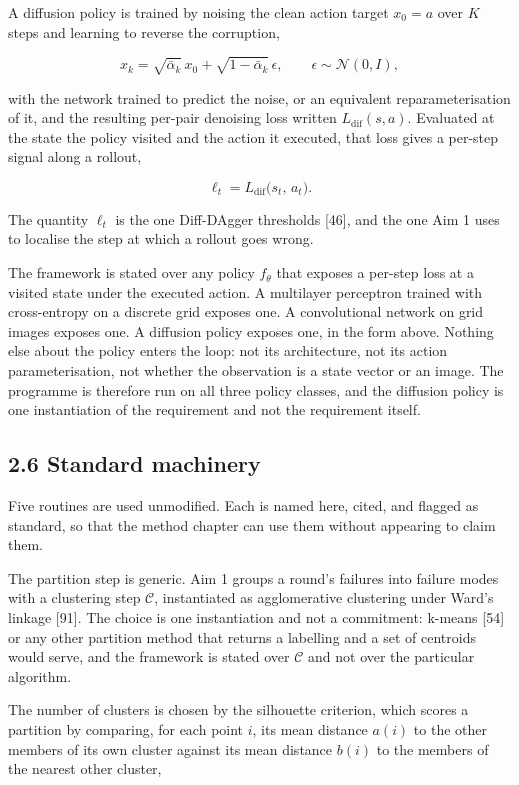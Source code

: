 \documentclass[
  11pt,
]{article}
\begin{document}
A diffusion policy is trained by noising the clean action target
\(x_0 = a\) over \(K\) steps and learning to reverse the corruption,

\[x_k = \sqrt{\bar\alpha_k}\, x_0 + \sqrt{1 - \bar\alpha_k}\, \epsilon,
\qquad \epsilon \sim \mathcal{N}(0, I),\]

with the network trained to predict the noise, or an equivalent
reparameterisation of it, and the resulting per-pair denoising loss
written \(L_{\mathrm{dif}}(s, a)\). Evaluated at the state the policy
visited and the action it executed, that loss gives a per-step signal
along a rollout,

\[\ell_t = L_{\mathrm{dif}}\big(s_t,\, a_t\big).\]

The quantity \(\ell_t\) is the one Diff-DAgger thresholds {[}46{]}, and
the one Aim 1 uses to localise the step at which a rollout goes wrong.

The framework is stated over any policy \(f_\theta\) that exposes a
per-step loss at a visited state under the executed action. A multilayer
perceptron trained with cross-entropy on a discrete grid exposes one. A
convolutional network on grid images exposes one. A diffusion policy
exposes one, in the form above. Nothing else about the policy enters the
loop: not its architecture, not its action parameterisation, not whether
the observation is a state vector or an image. The programme is
therefore run on all three policy classes, and the diffusion policy is
one instantiation of the requirement and not the requirement itself.

\hypertarget{standard-machinery}{%
\subsection{2.6 Standard machinery}\label{standard-machinery}}

Five routines are used unmodified. Each is named here, cited, and
flagged as standard, so that the method chapter can use them without
appearing to claim them.

The partition step is generic. Aim 1 groups a round's failures into
failure modes with a clustering step \(\mathcal{C}\), instantiated as
agglomerative clustering under Ward's linkage {[}91{]}. The choice is
one instantiation and not a commitment: k-means {[}54{]} or any other
partition method that returns a labelling and a set of centroids would
serve, and the framework is stated over \(\mathcal{C}\) and not over the
particular algorithm.

The number of clusters is chosen by the silhouette criterion, which
scores a partition by comparing, for each point \(i\), its mean distance
\(a(i)\) to the other members of its own cluster against its mean
distance \(b(i)\) to the members of the nearest other cluster,
\end{document}

